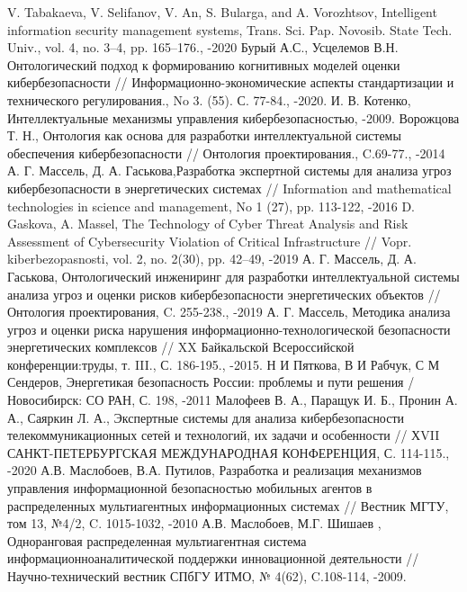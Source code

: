 \medskip
\begin{thebibliography}{}
V. Tabakaeva, V. Selifanov, V. An, S. Bularga, and A. Vorozhtsov,
Intelligent information security management systems,  Trans. Sci. Pap. Novosib. State Tech. Univ., vol. 4,
no. 3–4, pp. 165–176., -2020
Бурый А.С., Усцелемов В.Н. Онтологический подход к формированию когнитивных моделей оценки
кибербезопасности // Информационно-экономические аспекты стандартизации и технического
регулирования.,  No 3. (55). С. 77-84., -2020.
И. В. Котенко, Интеллектуальные механизмы управления кибербезопасностью, -2009.
Ворожцова Т. Н., Онтология как основа для разработки интеллектуальной системы обеспечения
кибербезопасности // Онтология проектирования., C.69-77., -2014
А. Г. Массель, Д. А. Гаськова,Разработка экспертной системы для анализа угроз кибербезопасности в энергетических
системах // Information and mathematical technologies in science and management, No 1 (27), pp. 113-122, -2016
D. Gaskova, A. Massel, The Technology of Cyber Threat Analysis and Risk Assessment of Cybersecurity
Violation of Critical Infrastructure // Vopr. kiberbezopasnosti, vol. 2, no. 2(30), pp. 42–49, -2019
А. Г. Массель, Д. А. Гаськова, Онтологический инжениринг для разработки интеллектуальной системы анализа угроз
и оценки рисков кибербезопасности энергетических объектов // Онтология проектирования, C. 255-238., -2019
А. Г. Массель, Методика анализа угроз и оценки риска нарушения информационно-технологической
безопасности энергетических комплексов // XX Байкальской Всероссийской конференции:труды,
т. III., С. 186-195., -2015.
Н И Пяткова, В И Рабчук, С М Сендеров, Энергетикая безопасность России: проблемы и пути решения / Новосибирск:
СО РАН, С. 198, -2011
Малофеев В. А., Паращук И. Б., Пронин А. А., Саяркин Л. А., Экспертные системы для анализа кибербезопасности
телекоммуникационных сетей и технологий, их задачи и особенности // ХVII САНКТ-ПЕТЕРБУРГСКАЯ
МЕЖДУНАРОДНАЯ КОНФЕРЕНЦИЯ, С. 114-115., -2020
А.В. Маслобоев, В.А. Путилов, Разработка и реализация механизмов управления информационной безопасностью
мобильных агентов в распределенных мультиагентных информационных системах // Вестник МГТУ, том 13, №4/2,
C. 1015-1032, -2010
А.В. Маслобоев, М.Г. Шишаев ,  Одноранговая распределенная мультиагентная система
информационноаналитической поддержки инновационной деятельности //
Научно-технический вестник СПбГУ ИТМО, № 4(62), C.108-114, -2009.

\end{thebibliography}

